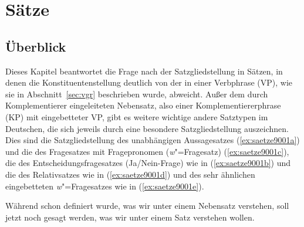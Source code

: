 \chapter{Sätze}

\label{sec:saetze}

\section{Überblick}

Dieses Kapitel beantwortet die Frage nach der Satzgliedstellung in Sätzen, in denen die Konstituentenstellung deutlich von der in einer Verbphrase (VP), wie sie in Abschnitt~\ref{sec:vgr} beschrieben wurde, abweicht.
Außer dem durch Komplementierer eingeleiteten Nebensatz, also einer Komplementiererphrase (KP) mit eingebetteter VP, gibt es weitere wichtige andere Satztypen im Deutschen, die sich jeweils durch eine besondere Satzgliedstellung auszeichnen.
Dies sind die Satzgliedstellung des unabhängigen Aussagesatzes (\ref{ex:saetze9001a}) und die des Fragesatzes mit Fragepronomen (\textit{w}"=Fragesatz) (\ref{ex:saetze9001c}), die des Entscheidungsfragesatzes (Ja\slash Nein-Frage) wie in (\ref{ex:saetze9001b}) und die des Relativsatzes wie in (\ref{ex:saetze9001d}) und des sehr ähnlichen eingebetteten \textit{w}"=Fragesatzes wie in (\ref{ex:saetze9001e}).

\begin{exe}
  \ex\label{ex:saetze9001}
  \begin{xlist}
  \end{xlist}
\end{exe}

Während schon definiert wurde, was wir unter einem Nebensatz verstehen, soll jetzt noch gesagt werden, was wir unter einem Satz verstehen wollen.


